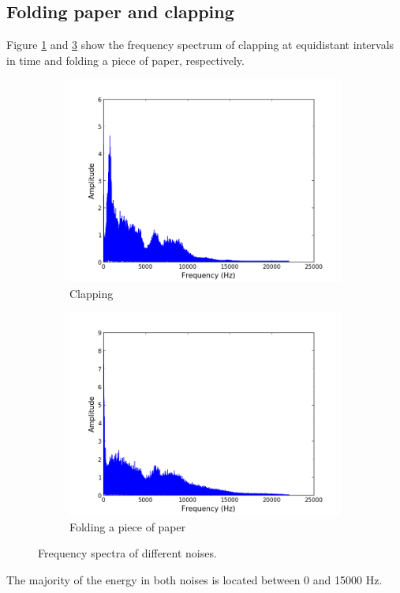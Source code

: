 \subsection{Folding paper and clapping}
Figure \ref{fig:clapping} and \ref{fig:folding} show the frequency spectrum of clapping at equidistant intervals in time and folding a piece of paper, respectively.
\begin{figure}[H]
\centering
\begin{subfigure}{0.49\textwidth}
\centering
\includegraphics[width=\textwidth]{figures/freqanal/clapping.png}
\caption{Clapping}
\label{fig:clapping}
\end{subfigure}
\begin{subfigure}{0.49\textwidth}
\centering
\includegraphics[width=\textwidth]{figures/freqanal/folding.png}
\caption{Folding a piece of paper}
\label{fig:folding}
\end{subfigure}
\caption{Frequency spectra of different noises.}
\end{figure}
The majority of the energy in both noises is located between 0 and 15000 Hz.
